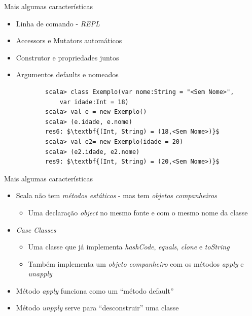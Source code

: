 \documentclass{beamer}
\begin{document}
\begin{frame}[fragile]{Mais algumas características} 
    \begin{itemize} %
        \item Linha de comando - \emph{REPL}
        \item Accessors e Mutators automáticos
        \item Construtor e propriedades juntos
        \item Argumentos defaults e nomeados
		\begin{lstlisting}
		scala> class Exemplo(var nome:String = "<Sem Nome>", 
			var idade:Int = 18)
		scala> val e = new Exemplo()
		scala> (e.idade, e.nome)
		res6: $\textbf{(Int, String) = (18,<Sem Nome>)}$
		scala> val e2= new Exemplo(idade = 20)
		scala> (e2.idade, e2.nome)
		res9: $\textbf{(Int, String) = (20,<Sem Nome>)}$
		\end{lstlisting}
    \end{itemize}
\end{frame}

\begin{frame}[fragile]{Mais algumas características} 
    \begin{itemize} %
        \item Scala não tem \emph{métodos estáticos} - mas tem \emph{objetos companheiros}
        \begin{itemize}
	\item Uma declaração \emph{object} no mesmo fonte e com o mesmo nome da classe
        \end{itemize}
        \item \emph{Case Classes}
        \begin{itemize}
              \item Uma classe que já implementa \emph{hashCode}, \emph{equals}, \emph{clone} e \emph{toString} 
	   \item Também implementa um \emph{objeto companheiro} com os métodos \emph{apply} e \emph{unapply}
        \end{itemize}
        \item Método \emph{apply} funciona como um ``método default''
        \item Método \emph{unpply} serve para ``desconstruir'' uma classe
    \end{itemize}
\end{frame}
\end{document}
